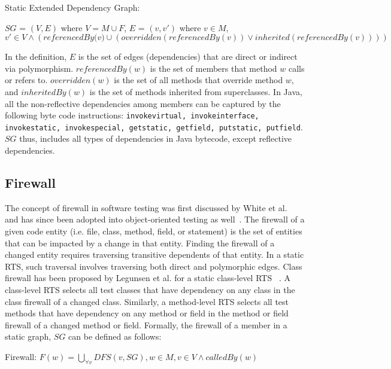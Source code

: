 \begin{definition}
\label{def:staticextendedcallgraph}
Static Extended Dependency Graph: 
\end{definition}
\noindent
$SG$ = $(V, E)$ where $ V = M \cup F$, $E$ = $(v, v')$ where $v \in M$, $v' \in V \land (\textit{referencedBy(v)}  \cup (overridden(referencedBy(v)) \lor inherited(referencedBy(v)) ))$  

In the definition, $E$ is the set of edges (dependencies) that are direct or indirect via polymorphism. $referencedBy(w)$ is  the set of members that method $w$ calls or refers to. $overridden(w)$ is the set of all methods that override method $w$, and $inheritedBy(w)$ is the set of methods inherited from superclasses. In Java, all the non-reflective dependencies among members can be captured by the following byte code instructions: \texttt{invokevirtual, invokeinterface, invokestatic, invokespecial, getstatic, getfield, putstatic, putfield}. $SG$ thus, includes all types of dependencies in Java bytecode, except reflective dependencies.  

\subsection{Firewall}

The concept of firewall in software testing was first discussed by White et al.~\cite{white1992firewall} and has since been adopted into object-oriented testing as well~\cite{white2003firewall, white2005utilization, white2008extended, starts, hyrts}. The firewall of a given code entity (i.e. file, class, method, field, or statement) is the set of entities that can be impacted by a change in that entity. Finding the firewall of a changed entity requires traversing transitive dependents of that entity. In a static RTS, such traversal involves traversing both direct and polymorphic edges. Class firewall has been proposed by Legunsen et al. for a static class-level RTS ~\cite{legunsen2016extensive}. A class-level RTS selects all test classes that have dependency on any class in the class firewall of a changed class. Similarly, a method-level RTS selects all test methods that have dependency on any method or field in the method or field firewall of a changed method or field. Formally, the firewall of a member in a static graph, $SG$ can be defined as follows: 
\begin{definition}\label{def:firewall}
Firewall: $F(w) = {\bigcup}_{\forall v}{DFS(v, SG)}, w \in M,v \in V \land calledBy(w) $
\end{definition}

